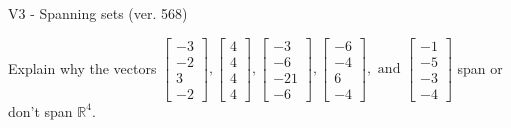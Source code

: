 \begin{exercise}
  \begin{exerciseTitle}V3 - Spanning sets (ver. 568)\end{exerciseTitle}
  \begin{exerciseStatement}
    Explain why the vectors \(\left[\begin{array}{r}
-3 \\
-2 \\
3 \\
-2
\end{array}\right] , \left[\begin{array}{r}
4 \\
4 \\
4 \\
4
\end{array}\right] , \left[\begin{array}{r}
-3 \\
-6 \\
-21 \\
-6
\end{array}\right] , \left[\begin{array}{r}
-6 \\
-4 \\
6 \\
-4
\end{array}\right] , \text{ and } \left[\begin{array}{r}
-1 \\
-5 \\
-3 \\
-4
\end{array}\right]\) span or don't span \(\mathbb{R}^4\). 
	



\end{exerciseStatement}
\end{exercise}
